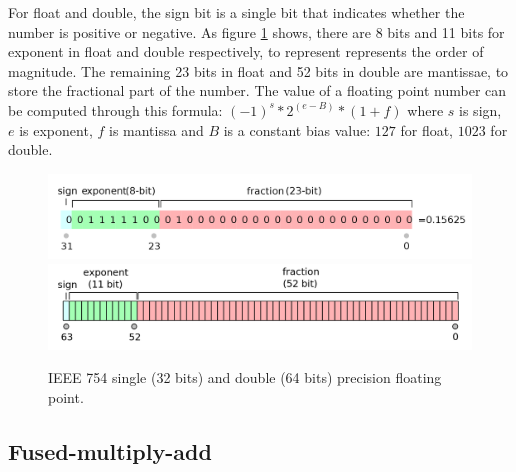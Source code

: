 \documentclass[logo,bsc,singlespacing,parskip]{infthesis}
\begin{document}
For float and double, the sign bit is a single bit that indicates whether the
number is positive or negative. As figure \ref{fig:ieee-f32} shows, there are 8
bits and 11 bits for exponent in float and double respectively, to represent
represents the order of magnitude. The remaining 23 bits in float and 52 bits in
double are mantissae, to store the fractional part of the number. The value of a
floating point number can be computed through this formula: 
\begin{math} (-1)^s * 2^{(e - B)} * (1 + f)\end{math}
where \begin{math}s\end{math} is sign, \begin{math}e\end{math} is exponent, 
\begin{math}f\end{math} is mantissa and \begin{math}B\end{math} is a constant bias
value: \begin{math}127\end{math} for float, \begin{math}1023\end{math} for double. 


\begin{figure}
    \includegraphics[width=\linewidth]{image/ieee-f32.png}
    \includegraphics[width=\linewidth]{image/ieee-f64.png}
    \caption{IEEE 754 single (32 bits) and double (64 bits) precision floating
    point. \cite{ieee754-diagram}}
    \label{fig:ieee-f32}
\end{figure}


\subsection{Fused-multiply-add}
\label{sec:FMA}
\end{document}
